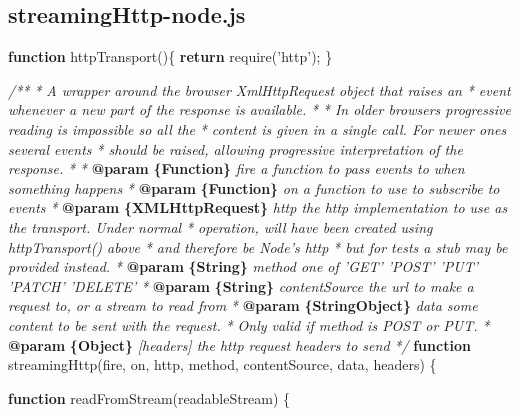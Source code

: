 \documentclass[]{article}
\newenvironment{Shaded}{}{}
\newcommand{\KeywordTok}[1]{\textcolor[rgb]{0.00,0.44,0.13}{\textbf{{#1}}}}
\newcommand{\StringTok}[1]{\textcolor[rgb]{0.25,0.44,0.63}{{#1}}}
\newcommand{\CommentTok}[1]{\textcolor[rgb]{0.38,0.63,0.69}{\textit{{#1}}}}
\newcommand{\FunctionTok}[1]{\textcolor[rgb]{0.02,0.16,0.49}{{#1}}}
\newcommand{\NormalTok}[1]{{#1}}
\begin{document}
\pagebreak

\subsection{streamingHttp-node.js}

\begin{Shaded}
\begin{Highlighting}[]
\KeywordTok{function} \FunctionTok{httpTransport}\NormalTok{()\{}
   \KeywordTok{return} \FunctionTok{require}\NormalTok{(}\StringTok{'http'}\NormalTok{);}
\NormalTok{\}}

\CommentTok{/**}
\CommentTok{ * A wrapper around the browser XmlHttpRequest object that raises an }
\CommentTok{ * event whenever a new part of the response is available.}
\CommentTok{ * }
\CommentTok{ * In older browsers progressive reading is impossible so all the }
\CommentTok{ * content is given in a single call. For newer ones several events}
\CommentTok{ * should be raised, allowing progressive interpretation of the response.}
\CommentTok{ *      }
\CommentTok{ * }\KeywordTok{@param}\CommentTok{ }\KeywordTok{\{Function\}}\CommentTok{ fire a function to pass events to when something happens}
\CommentTok{ * }\KeywordTok{@param}\CommentTok{ }\KeywordTok{\{Function\}}\CommentTok{ on a function to use to subscribe to events}
\CommentTok{ * }\KeywordTok{@param}\CommentTok{ }\KeywordTok{\{XMLHttpRequest\}}\CommentTok{ http the http implementation to use as the transport. Under normal}
\CommentTok{ *          operation, will have been created using httpTransport() above}
\CommentTok{ *          and therefore be Node's http}
\CommentTok{ *          but for tests a stub may be provided instead.}
\CommentTok{ * }\KeywordTok{@param}\CommentTok{ }\KeywordTok{\{String\}}\CommentTok{ method one of 'GET' 'POST' 'PUT' 'PATCH' 'DELETE'}
\CommentTok{ * }\KeywordTok{@param}\CommentTok{ }\KeywordTok{\{String\}}\CommentTok{ contentSource the url to make a request to, or a stream to read from}
\CommentTok{ * }\KeywordTok{@param}\CommentTok{ }\KeywordTok{\{String\textbar{}Object\}}\CommentTok{ data some content to be sent with the request.}
\CommentTok{ *                        Only valid if method is POST or PUT.}
\CommentTok{ * }\KeywordTok{@param}\CommentTok{ }\KeywordTok{\{Object\}}\CommentTok{ [headers] the http request headers to send                       }
\CommentTok{ */}  
\KeywordTok{function} \FunctionTok{streamingHttp}\NormalTok{(fire, on, http, method, contentSource, data, headers) \{}

   \KeywordTok{function} \FunctionTok{readFromStream}\NormalTok{(readableStream) \{}
         

\end{Highlighting}
\end{Shaded}
\end{document}

